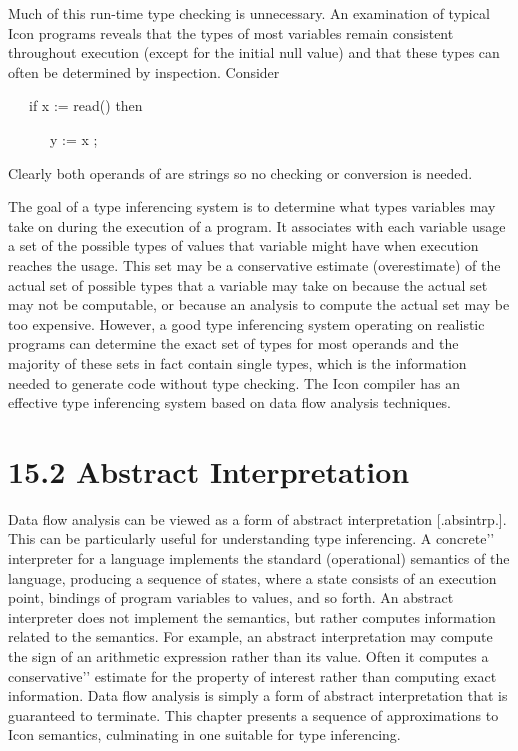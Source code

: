 Much of this run-time type checking is unnecessary. An examination of
typical Icon programs reveals that the types of most variables remain
consistent throughout execution (except for the initial null value)
and that these types can often be determined by inspection. Consider

{\ttfamily\mdseries
\ \ \ if x := read() then}

{\ttfamily\mdseries
\ \ \ \ \ \ y := x {\textbar}{\textbar} {\textquotedbl};{\textquotedbl}}


Clearly both operands of {\textbar}{\textbar} are strings so no
checking or conversion is needed.

The goal of a type inferencing system is to determine what types
variables may take on during the execution of a program. It associates
with each variable usage a set of the possible types of values that
variable might have when execution reaches the usage. This set may be
a conservative estimate (overestimate) of the actual set of possible
types that a variable may take on because the actual set may not be
computable, or because an analysis to compute the actual set may be
too expensive. However, a good type inferencing system operating on
realistic programs can determine the exact set of types for most
operands and the majority of these sets in fact contain single types,
which is the information needed to generate code without type
checking. The Icon compiler has an effective type inferencing system
based on data flow analysis techniques.

\section[15.2 Abstract Interpretation ]{15.2 Abstract Interpretation }

Data flow analysis can be viewed as a form of abstract interpretation
[.absintrp.]. This can be particularly useful for understanding type
inferencing. A {\textasciigrave}{\textasciigrave}concrete'{}'
interpreter for a language implements the standard (operational)
semantics of the language, producing a sequence of states, where a
state consists of an execution point, bindings of program variables to
values, and so forth. An abstract interpreter does not implement the
semantics, but rather computes information related to the
semantics. For example, an abstract interpretation may compute the
sign of an arithmetic expression rather than its value. Often it
computes a {\textasciigrave}{\textasciigrave}conservative'{}' estimate
for the property of interest rather than computing exact
information. Data flow analysis is simply a form of abstract
interpretation that is guaranteed to terminate. This chapter presents
a sequence of approximations to Icon semantics, culminating in one
suitable for type inferencing.


